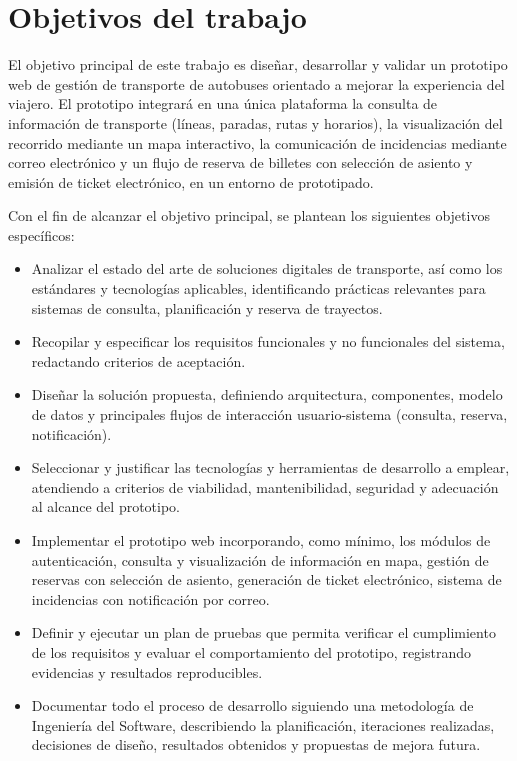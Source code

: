 \section{Objetivos del trabajo}
\label{sec:objetivos}

El objetivo principal de este trabajo es diseñar, desarrollar y validar un prototipo web de gestión de transporte de autobuses orientado a mejorar la experiencia del viajero. El prototipo integrará en una única plataforma la consulta de información de transporte (líneas, paradas, rutas y horarios), la visualización del recorrido mediante un mapa interactivo, la comunicación de incidencias mediante correo electrónico y un flujo de reserva de billetes con selección de asiento y emisión de ticket electrónico, en un entorno de prototipado.

Con el fin de alcanzar el objetivo principal, se plantean los siguientes objetivos específicos:

\begin{itemize}
    \item Analizar el estado del arte de soluciones digitales de transporte, así como los estándares y tecnologías aplicables, identificando prácticas relevantes para sistemas de consulta, planificación y reserva de trayectos.
    \item Recopilar y especificar los requisitos funcionales y no funcionales del sistema, redactando criterios de aceptación.
    \item Diseñar la solución propuesta, definiendo arquitectura, componentes, modelo de datos y principales flujos de interacción usuario-sistema (consulta, reserva, notificación).
    \item Seleccionar y justificar las tecnologías y herramientas de desarrollo a emplear, atendiendo a criterios de viabilidad, mantenibilidad, seguridad y adecuación al alcance del prototipo.
    \item Implementar el prototipo web incorporando, como mínimo, los módulos de autenticación, consulta y visualización de información en mapa, gestión de reservas con selección de asiento, generación de ticket electrónico, sistema de incidencias con notificación por correo.
    \item Definir y ejecutar un plan de pruebas que permita verificar el cumplimiento de los requisitos y evaluar el comportamiento del prototipo, registrando evidencias y resultados reproducibles.
    \item Documentar todo el proceso de desarrollo siguiendo una metodología de Ingeniería del Software, describiendo la planificación, iteraciones realizadas, decisiones de diseño, resultados obtenidos y propuestas de mejora futura.
\end{itemize}

